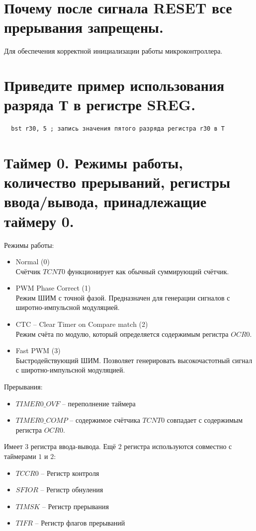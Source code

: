 \section{Почему после сигнала RESET все прерывания запрещены.}
Для обеспечения корректной инициализации работы
микроконтроллера.

\section{Приведите пример использования разряда Т в регистре SREG.}
\begin{verbatim}
  bst r30, 5 ; запись значения пятого разряда регистра r30 в T
\end{verbatim}


\section{Таймер 0. Режимы работы, количество прерываний, регистры ввода/вывода, принадлежащие таймеру 0.}

Режимы работы:
\begin{itemize}
  \item Normal (0)\\
  Счётчик $TCNT0$ функционирует как обычный суммирующий счётчик.
  \item PWM Phase Correct (1)\\
  Режим ШИМ с точной фазой. Предназначен для генерации сигналов с 
  широтно-импульсной модуляцией.
  \item CTC -- Clear Timer on Compare match (2)\\
  Режим счёта по модулю, который определяется содержимым регистра $OCR0$.
  \item Fast PWM (3) \\
  Быстродействующий ШИМ. Позволяет генерировать высокочастотный сигнал 
  с широтно-импульсной модуляцией.
\end{itemize}

Прерывания:
\begin{itemize}
  \item $TIMER0\_OVF$ -- переполнение таймера
  \item $TIMER0\_COMP$ -- содержимое счётчика $TCNT0$ совпадает с 
  содержимым регистра $OCR0$.
\end{itemize}

Имеет $3$ регистра ввода-вывода. Ещё $2$ регистра используются совместно 
с таймерами $1$ и $2$:
\begin{itemize}
  \item $TCCR0$ -- Регистр контроля
  \item $SFIOR$ -- Регистр обнуления
  \item $TIMSK$ -- Регистр прерывания
  \item $TIFR$ -- Регистр флагов прерываний
\end{itemize}

